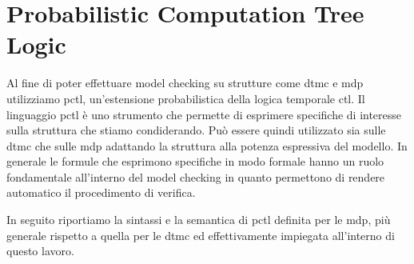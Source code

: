 \section{Probabilistic Computation Tree Logic}
Al fine di poter effettuare model checking su strutture come \ac{dtmc} e \ac{mdp} utilizziamo \ac{pctl}, un'estensione probabilistica della logica temporale \ac{ctl}. Il linguaggio \ac{pctl} è uno strumento che permette di esprimere specifiche di interesse sulla struttura che stiamo condiderando. Può essere quindi utilizzato sia sulle \ac{dtmc} che sulle \ac{mdp} adattando la struttura alla potenza espressiva del modello. In generale le formule che esprimono specifiche in modo formale hanno un ruolo fondamentale all'interno del model checking in quanto permettono di rendere automatico il procedimento di verifica.

In seguito riportiamo la sintassi e la semantica di \ac{pctl} definita per le \ac{mdp}, più generale rispetto a quella per le \ac{dtmc} ed effettivamente impiegata all'interno di questo lavoro.

